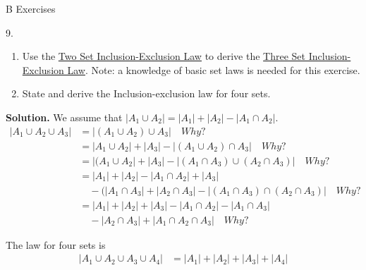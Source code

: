 \documentclass[10pt,]{book}
\theoremstyle{plain}
\theoremstyle{definition}
\theoremstyle{definition}
\theoremstyle{definition}
\begin{document}
\par\smallskip\noindent
\hypertarget{exercisegroup-6}{}\typeout{************************************************}
\typeout{************************************************}
B Exercises%
\begin{exercisegroup}
\item[9.]\hypertarget{exercise-40}{}\leavevmode%
\begin{enumerate}[label=\alph*]
\item\hypertarget{li-57}{} Use the \hyperlink{ie2}{Two Set Inclusion-Exclusion Law}  to derive the  \hyperlink{ie3}{Three Set Inclusion-Exclusion Law}. Note: a knowledge of basic set laws is needed for this exercise.%
\item\hypertarget{li-58}{} State and derive the Inclusion-exclusion law for four sets.%
\end{enumerate}
%
\par\smallskip
\par\smallskip
\noindent\textbf{Solution.}\hypertarget{solution-1}{}\quad
 We assume that \( \lvert A_1 \cup A_2 \rvert = \lvert A_1 \rvert +\lvert  A_2\rvert  -\lvert A_1\cap A_2\rvert   \).
\begin{equation*}
\begin{split}
\lvert A_1 \cup A_2\cup A_3 \rvert  &  =\lvert (A_1\cup A_2) \cup A_3 \rvert   \quad  Why?\\
	& = \lvert A_1\cup A_2\rvert   +\lvert  A_3 \rvert  -\lvert (A_1\cup A_2)\cap A_3\rvert \quad Why? \\
	& =\lvert (A_1\cup A_2\rvert   +\lvert  A_3\rvert  -\lvert (A_1\cap A_3)\cup (A_2\cap A_3)\rvert \quad Why?\\
	& =\lvert  A_1\rvert  +\lvert  A_2\rvert  -\lvert A_1\cap A_2\rvert   +\lvert  A_3\rvert \\
	& \quad -(\lvert A_1\cap A_3\rvert   +\lvert A_2\cap A_3\rvert   -\lvert (A_1\cap A_3)\cap (A_2\cap A_3)\rvert\quad Why?\\
	& =\lvert  A_1\rvert  +\lvert  A_2\rvert  +\lvert  A_3\rvert  -\lvert A_1\cap A_2\rvert -\lvert A_1\cap A_3\rvert\\
	& \quad  -\lvert A_2\cap A_3\rvert +\lvert A_1\cap A_2\cap A_3\rvert \quad Why?  
\end{split}
\end{equation*}
%
\par
 The law for four sets is  
\begin{equation*}
\begin{split}
\lvert A_1\cup A_2\cup A_3\cup A_4\rvert  & =\lvert  A_1\rvert  +\lvert  A_2\rvert  +\lvert  A_3\rvert  +\lvert  A_4\rvert\\

\end{split}
\end{equation*}
\end{exercisegroup}
\end{document}
